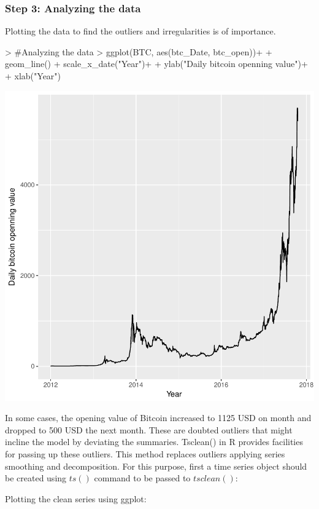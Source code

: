 \documentclass{article}
\begin{document}
\subsubsection*{Step 3: Analyzing the data}
Plotting the data to find the outliers and irregularities is of importance.
\begin{Schunk}
\begin{Sinput}
> #Analyzing the data
> ggplot(BTC, aes(btc_Date, btc_open))+ 
+   geom_line() + scale_x_date("Year")+ 
+   ylab("Daily bitcoin openning value")+
+   xlab("Year")
\end{Sinput}
\end{Schunk}
\includegraphics{Report-012}

In some cases, the opening value of Bitcoin increased to 1125 USD on month and dropped to 500 USD the next month. These are doubted outliers that might incline the model by deviating the summaries. Tsclean() in R provides facilities for passing up these outliers. This method replaces outliers applying series smoothing and decomposition. For this purpose, first a time series object should be created using $ts()$ command to be passed to $tsclean()$:

Plotting the clean series using ggplot:
\end{document}
